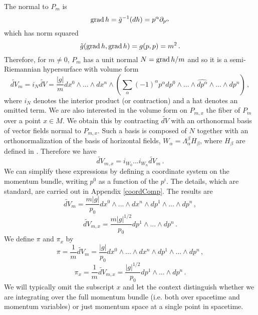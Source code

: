 The normal to $P_m$ is 
\begin{equation}
\operatorname{grad} h=\tilde{g}^{-1}(dh)=p^\alpha\partial_{p^\alpha}
\end{equation}
which has norm squared 
\begin{equation}
\tilde{g}(\operatorname{grad} h,\operatorname{grad} h)=g(p,p)=m^2\,.
\end{equation}
Therefore, for $m\neq 0$, $P_m$ has a unit normal $N=\operatorname{grad} h/m$ and so it is a semi-Riemannian hypersurface with volume form
\begin{equation}
\widetilde{dV}_m=i_N \widetilde{dV}=\frac{|g|}{m}dx^0\wedge...\wedge dx^n\wedge\left(\sum_\alpha (-1)^\alpha p^\alpha dp^0\wedge...\wedge\widehat{dp^\alpha}\wedge...\wedge dp^n\right)\,,
\end{equation}
where $i_N$ denotes the interior product (or contraction) and a hat denotes an omitted term.  We are also interested in the volume form on $P_{m,x}$ the fiber of $P_m$ over a point $x\in M$.  We obtain this by contracting $\widetilde{dV}$ with an orthonormal basis of vector fields normal to $P_{m,x}$. Such a basis is composed of $N$ together with an orthonormalization of the basis of horizontal fields, $W_\alpha=\Lambda^\beta_\alpha H_\beta$, where $H_\beta$ are defined in . Therefore we have
\begin{equation}
\widetilde{dV}_{m,x}=i_{W_0}...i_{W_n}\widetilde{dV}_m\,.
\end{equation}
 We can simplify these expressions by defining a coordinate system on the momentum bundle, writing $p^0$ as a function of the $p^i$.  The details, which are standard, are carried  out in Appendix  \ref{coordComp}.  The results are
\begin{equation}
\widetilde{dV}_m=\frac{m|g|}{p_0}dx^0\wedge...\wedge dx^n\wedge dp^1\wedge...\wedge dp^n\,,
\end{equation}
\begin{equation}
\widetilde{dV}_{m,x}=\frac{m|g|^{1/2}}{p_0}dp^1\wedge...\wedge dp^n\,.
\end{equation}
We define $\pi$ and $\pi_x$ by
\begin{equation}
\pi=\frac{1}{m}\widetilde{dV}_m=\frac{|g|}{p_0}dx^0\wedge...\wedge dx^n\wedge dp^1\wedge...\wedge dp^n\,,
\end{equation}
\begin{equation}\label{pi:x}
\pi_x=\frac{1}{m}\widetilde{dV}_{m,x}=\frac{|g|^{1/2}}{p_0}dp^1\wedge...\wedge dp^n\,.
\end{equation}
We will typically omit the subscript $x$ and let the context distinguish whether we are integrating over the full momentum bundle (i.e. both over spacetime and momentum variables) or just momentum space at a single point in spacetime.  \\

